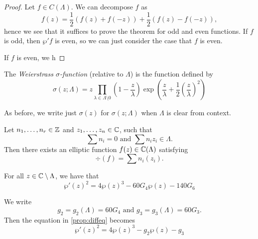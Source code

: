 \begin{proof}
	Let $f \in C(\Lambda)$. We can decompose $f$ as
	\begin{equation*}
		f(z) = \frac{1}{2}(f(z) + f (-z)) + \frac{1}{2}(f(z) - f(-z)),
	\end{equation*}
	hence we see that it suffices to prove the theorem for odd and even
	functions. If $f$ is odd, then $\wp'f$ is even, so we can just consider
	the case that $f$ is even.

	If $f$ is even, we h
\end{proof}

\begin{definition}
	The \emph{Weierstrass $\sigma$-function} (relative to $\Lambda$) is the
	function defined by
	\begin{equation*}
		\sigma(z; \Lambda) = z \prod_{\lambda\in\Lambda\setminus 0}
		\left(1 - \frac{z}{\lambda}\right)
		\exp\left(\frac{z}{\lambda} + \frac{1}{2}\left(\frac{z}{\lambda}\right)^2\right)
	\end{equation*}
\end{definition}

\begin{notation}
	As before, we write just $\sigma(z)$ for $\sigma(z; \Lambda)$ when $\Lambda$
	is clear from context.
\end{notation}

\begin{proposition}
	\label{prop:complex-divisors}
	Let $n_1, \dots, n_r \in \mathbb{Z}$ and $z_1, \dots, z_n \in \mathbb{C}$, such that
	\begin{equation*}
		\sum n_i = 0 \textrm{ and } \sum n_iz_i \in \Lambda.
	\end{equation*}
	Then there exists an elliptic function $f(z) \in \mathbb{C}(\Lambda)$ satisfying
	\begin{equation*}
		\div(f) = \sum n_i(z_i).
	\end{equation*}
\end{proposition}

\begin{proposition}
	\label{prop:diffeq}
	For all $z \in \mathbb{C} \setminus \Lambda$, we have that
	\begin{equation*}
		\wp'(z)^2 = 4\wp(z)^3 - 60G_4\wp(z) - 140G_6
	\end{equation*}
\end{proposition}

\begin{remark}
	We write
	\begin{equation*}
		g_2 = g_2(\Lambda) = 60G_4
		\textrm{ and }
		g_3 = g_3(\Lambda) = 60G_3.
	\end{equation*}
	Then the equation in \ref{prop:diffeq} becomes
	\begin{equation*}
		\wp'(z)^2 = 4\wp(z)^3 - g_2\wp(z) - g_3
	\end{equation*}
\end{remark}

